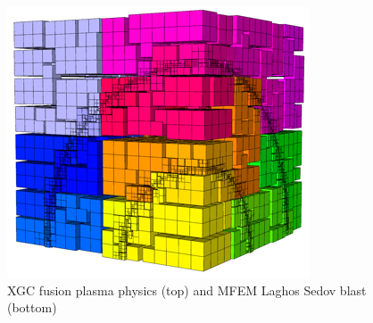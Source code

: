 \documentclass[aspectratio=169]{beamer}
\begin{document}
\begin{frame}
\begin{columns}
\begin{column}{0.3\textwidth}
\begin{figure}
        \includegraphics[width=.75\textwidth]{figures/laghos_sedov.png}\\
        \tiny{XGC fusion plasma physics (top) and MFEM Laghos Sedov blast
        (bottom)}
      \end{figure}
    \end{column}
  \end{columns}
\end{frame}
\end{document}
